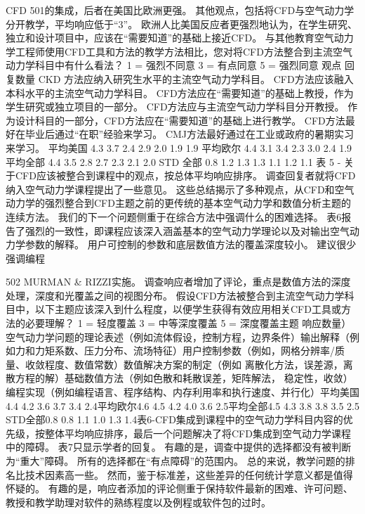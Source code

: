 \documentclass[UTF8,11pt,a4paper,openany,fontset=fandol]{ctexbook}
\begin{document}
CFD 501的集成，后者在美国比欧洲更强。 其他观点，包括将CFD与空气动力学分开教学，平均响应低于“3”。 欧洲人比美国反应者更强烈地认为，在学生研究、独立和设计项目中，应该在“需要知道”的基础上接近CFD。 与其他教育空气动力学工程师使用CFD工具和方法的教学方法相比，您对将CFD方法整合到主流空气动力学科目中有什么看法？ 1 = 强烈不同意 3 = 有点同意 5 = 强烈同意 观点 回复数量 CKD 方法应纳入研究生水平的主流空气动力学科目。 CFD方法应该融入本科水平的主流空气动力学科目。 CFD方法应在“需要知道”的基础上教授，作为学生研究或独立项目的一部分。 CFD方法应与主流空气动力学科目分开教授。 作为设计科目的一部分，CFD方法应在“需要知道”的基础上进行教学。 CFD方法最好在毕业后通过“在职”经验来学习。 CMJ方法最好通过在工业或政府的暑期实习来学习。 平均美国 4.3 3.7 2.4 2.9 2.0 1.9 1.9 平均欧尔 4.4 3.1 3.4 2.3 3.0 2.4 1.9 平均全部 4.4 3.5 2.8 2.7 2.3 2.1 2.0 STD 全部 0.8 1.2 1.3 1.3 1.1 1.2 1.1 表 5 - 关于CFD应该被整合到课程中的观点，按总体平均响应排序。 调查回复者就将CFD纳入空气动力学课程提出了一些意见。 这些总结揭示了多种观点，从CFD和空气动力学的强烈整合到CFD主题之前的更传统的基本空气动力学和数值分析主题的连续方法。 我们的下一个问题侧重于在综合方法中强调什么的困难选择。 表6报告了强烈的一致性，即课程应该深入涵盖基本的空气动力学理论以及对输出空气动力学参数的解释。 用户可控制的参数和底层数值方法的覆盖深度较小。 建议很少强调编程

502 MURMAN \& RIZZI实施。 调查响应者增加了评论，重点是数值方法的深度处理，深度和光覆盖之间的视图分布。 假设CFD方法被整合到主流空气动力学科目中，以下主题应该深入到什么程度，以便学生获得有效应用相关CFD工具或方法的必要理解？ 1 = 轻度覆盖 3 = 中等深度覆盖 5 = 深度覆盖主题 响应数量）空气动力学问题的理论表述（例如流体假设，控制方程，边界条件）输出解释（例如力和力矩系数、压力分布、流场特征）用户控制参数（例如，网格分辨率/质量、收敛程度、数值常数）数值解决方案的制定（例如 离散化方法，误差源，离散方程的解）基础数值方法（例如色散和耗散误差，矩阵解法， 稳定性，收敛）编程实现（例如编程语言、程序结构、内存利用率和执行速度、并行化）平均美国4.4 4.2 3.6 3.7 3.4 2.4平均欧尔4.6 4.5 4.2 4.0 3.6 2.5平均全部4.5 4.3 3.8 3.8 3.5 2.5 STD全部0.8 0.8 1.1 1.0 1.3 1.4表6-CFD集成到课程中的空气动力学科目内容的优先级，按整体平均响应排序，最后一个问题解决了将CFD集成到空气动力学课程中的障碍。 表7只显示学者的回复。 有趣的是，调查中提供的选择都没有被判断为“重大”障碍。 所有的选择都在“有点障碍”的范围内。 总的来说，教学问题的排名比技术因素高一些。 然而，鉴于标准差，这些差异的任何统计学意义都是值得怀疑的。 有趣的是，响应者添加的评论侧重于保持软件最新的困难、许可问题、教授和教学助理对软件的熟练程度以及例程或软件包的过时。
\end{document}
